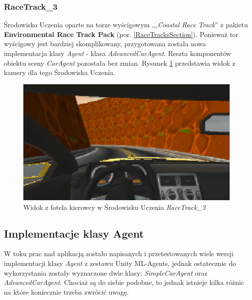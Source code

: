\subsubsection{RaceTrack\_3}
Środowisko Uczenia oparte na torze wyścigowym ,,,\textit{Coastal Race Track}'' z pakietu \textbf{Environmental Race Track Pack} (por. \ref{RaceTracksSection}). Ponieważ tor wyścigowy jest bardziej skomplikowany, przygotowana została nowa implementacja klasy \textit{Agent} - klasa \textit{AdvancedCarAgent}. Reszta komponentów obiektu sceny \textit{CarAgent} pozostała bez zmian. Rysunek \ref{RaceTrack3Cockpit} przedstawia widok z kamery dla tego Środowiska Uczenia. \\

\begin{figure}[h]
\begin{center}
\includegraphics[width=15cm]{resources/figures/race_track_3_cockpit.png}
\caption{Widok z fotela kierowcy w Środowisku Uczenia \textit{RaceTrack\_3}}
\label{RaceTrack3Cockpit}
\end{center}
\end{figure}

\subsection{Implementacje klasy Agent}
\label{AgentImplementations}
W toku prac nad aplikacją zostało napisanych i przetestowanych wiele wersji implementacji klasy \textit{Agent} z zestawu Unity ML-Agents, jednak ostatecznie do wykorzystania zostały wyznaczone dwie klasy: \textit{SimpleCarAgent} oraz \textit{AdvancedCarAgent}. Chociaż są do siebie podobne, to jednak istnieje kilka różnic na które koniecznie trzeba zwrócić uwagę.

